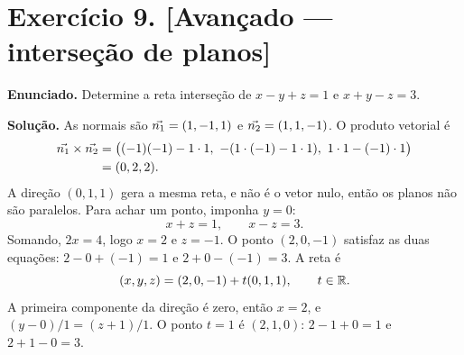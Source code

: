 \documentclass[11pt,a4paper]{article}
\begin{document}
\section*{Exercício 9. [Avançado --- interseção de planos]}

\textbf{Enunciado.} Determine a reta interseção de $x-y+z=1$ e $x+y-z=3$.

\textbf{Solução.}
As normais são $\vec{n_1}=(1,-1,1)$ e $\vec{n_2}=(1,1,-1)$. O produto vetorial é
\begin{align*}
\vec{n_1}\times\vec{n_2}
&=\bigl((-1)(-1)-1\cdot 1,\ -(1\cdot(-1)-1\cdot 1),\ 1\cdot 1-(-1)\cdot 1\bigr)\\
&=(0,2,2).
\end{align*}
A direção $(0,1,1)$ gera a mesma reta, e não é o vetor nulo, então os planos não são paralelos. Para achar um ponto, imponha $y=0$:
\[
x+z=1,\qquad x-z=3.
\]
Somando, $2x=4$, logo $x=2$ e $z=-1$. O ponto $(2,0,-1)$ satisfaz as duas equações: $2-0+(-1)=1$ e $2+0-(-1)=3$. A reta é
\[
(x,y,z)=(2,0,-1)+t(0,1,1),\qquad t\in\mathbb{R}.
\]
A primeira componente da direção é zero, então $x=2$, e $(y-0)/1=(z+1)/1$. O ponto $t=1$ é $(2,1,0)$: $2-1+0=1$ e $2+1-0=3$.
\end{document}
